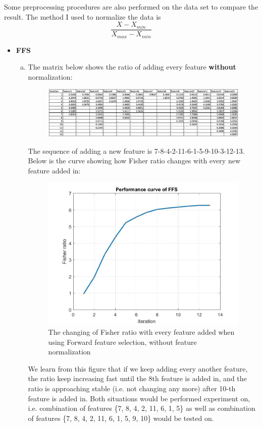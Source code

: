 \documentclass[a4paper]{article}
\begin{document}
\begin{spacing}{2.0}
\begin{enumerate}[(1)]
Some preprocessing procedures are also performed on the data set to compare the result. The method I used to normalize the data is $$\displaystyle\frac{X-X_{min}}{X_{max}-X_{min}}$$

\begin{itemize}
\item \textbf{FFS} 
\begin{enumerate}[(a)]
\item \large{The matrix below shows the ratio of adding every feature \textbf{without} normalization:}
\normalsize

\begin{figure}[H]
\centering
\includegraphics[width = 7.5in]{noNormalizetable.jpg}
\label{FFS}
\end{figure}

The sequence of adding a new feature is 7-8-4-2-11-6-1-5-9-10-3-12-13.
Below is the curve showing how Fisher ratio changes with every new feature added in:
\begin{figure}[H]
\centering
\includegraphics[width = 4in]{FFS.jpg}
\caption{The changing of Fisher ratio with every feature added when using Forward feature selection, without feature normalization}
\end{figure}
We learn from this figure that if we keep adding every another feature, the ratio keep increasing fast until the 8th feature is added in, and the ratio is approaching stable (i.e. not changing any more) after 10-th feature is added in. Both situations would be performed experiment on, i.e. combination of features \{7, 8, 4, 2, 11, 6, 1, 5\} as well as combination of features \{7, 8, 4, 2, 11, 6, 1, 5, 9, 10\} would be tested on. 


\end{enumerate}
\end{itemize}
\end{enumerate}
\end{spacing}
\end{document}
